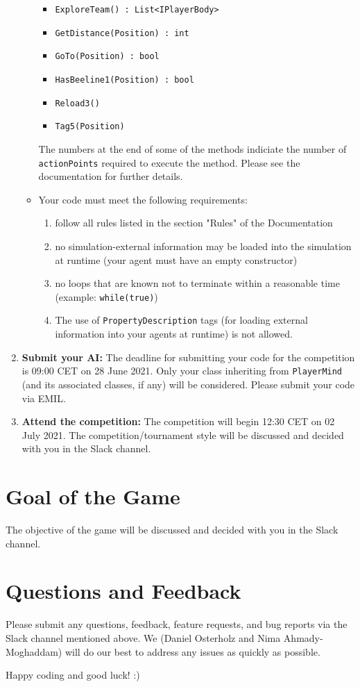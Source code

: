 \documentclass[
    a4paper,
    english,
    DIV=16,
    11pt,
    parskip=half,
]{scrartcl}
\begin{document}
\begin{enumerate}
\begin{itemize}
\begin{itemize}
            \item \texttt{ExploreTeam() : List<IPlayerBody>}
            \item \texttt{GetDistance(Position) : int}
            \item \texttt{GoTo(Position) : bool}
            \item \texttt{HasBeeline1(Position) : bool}
            \item \texttt{Reload3()}
            \item \texttt{Tag5(Position)}
        \end{itemize}
        The numbers at the end of some of the methods indiciate the number of \texttt{actionPoints} required to execute the method. Please see the documentation for further details.
        \item Your code must meet the following requirements:
        \begin{enumerate}
            \item follow all rules listed in the section "Rules" of the Documentation
            \item no simulation-external information may be loaded into the simulation at runtime (your agent must have an empty constructor)
            \item no loops that are known not to terminate within a reasonable time (example: \texttt{while(true)})
            \item The use of \texttt{PropertyDescription} tags (for loading external information into your agents at runtime) is not allowed.
        \end{enumerate}
    \end{itemize}
    \item \textbf{Submit your AI:} The deadline for submitting your code for the competition is 09:00 CET on 28 June 2021. Only your class inheriting from \texttt{PlayerMind} (and its associated classes, if any) will be considered. Please submit your code via EMIL. 
    \item \textbf{Attend the competition:} The competition will begin 12:30 CET on 02 July 2021. The competition/tournament style will be discussed and decided with you in the Slack channel.
    \end{enumerate}

\section*{Goal of the Game}
The objective of the game will be discussed and decided with you in the Slack channel.

\section*{Questions and Feedback}
Please submit any questions, feedback, feature requests, and bug reports via the Slack channel mentioned above. We (Daniel Osterholz and Nima Ahmady-Moghaddam) will do our best to address any issues as quickly as possible. \par Happy coding and good luck! :)

\end{document}
